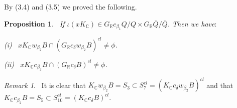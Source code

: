 \documentclass[12pt,a4paper]{amsart}
\newtheorem{proposition}[theorem]{Proposition}
\theoremstyle{definition}
\theoremstyle{remark}
\newtheorem{remark}[theorem]{Remark}
\numberwithin{equation}{section}
\def\br{\mathbb R}
\def\bc{\mathbb C}
\begin{document}
By (3.4) and (3.5) we proved the following.

\begin{proposition} \ If $\iota(xK_\bc)\in G_\br c_{\beta_1}Q/Q\times G_\br \overline{Q} /\overline{Q}$. Then we have$:$

{\rm (i)} \ $xK_\bc w_{\beta_2}B\cap (G_\br c_\delta w_{\beta_2}B)^{cl}\ne\phi$.

{\rm (ii)} \ $xK_\bc c_{\beta_2}B\cap (G_\br c_\delta B)^{cl}\ne\phi$.
\end{proposition}

\begin{remark} \ It is clear that $K_\bc w_{\beta_2}B=S_3\subset S_7^{cl}= (K_\bc c_\delta w_{\beta_2}B)^{cl}$ and that $K_\bc c_{\beta_2}B=S_5\subset S_{10}^{cl}= (K_\bc c_\delta B)^{cl}$.
\end{remark}
\end{document}
